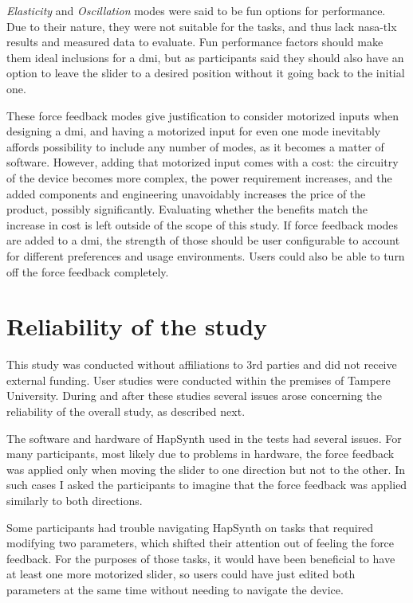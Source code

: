 \textit{Elasticity} and \textit{Oscillation} modes were said to be fun options for performance. Due to their nature, they were not suitable for the tasks, and thus lack \gls{nasa-tlx} results and measured data to evaluate. Fun performance factors should make them ideal inclusions for a \gls{dmi}, but as participants said they should also have an option to leave the slider to a desired position without it going back to the initial one.

These force feedback modes give justification to consider motorized inputs when designing a \gls{dmi}, and having a motorized input for even one mode inevitably affords possibility to include any number of modes, as it becomes a matter of software. However, adding that motorized input comes with a cost: the circuitry of the device becomes more complex, the power requirement increases, and the added components and engineering unavoidably increases the price of the product, possibly significantly. Evaluating whether the benefits match the increase in cost is left outside of the scope of this study. If force feedback modes are added to a \gls{dmi}, the strength of those should be user configurable to account for different preferences and usage environments. Users could also be able to turn off the force feedback completely.

\section{Reliability of the study}

This study was conducted without affiliations to 3rd parties and did not receive external funding. User studies were conducted within the premises of Tampere University. During and after these studies several issues arose concerning the reliability of the overall study, as described next.

The software and hardware of HapSynth used in the tests had several issues. For many participants, most likely due to problems in hardware, the force feedback was applied only when moving the slider to one direction but not to the other. In such cases I asked the participants to imagine that the force feedback was applied similarly to both directions.

Some participants had trouble navigating HapSynth on tasks that required modifying two parameters, which shifted their attention out of feeling the force feedback. For the purposes of those tasks, it would have been beneficial to have at least one more motorized slider, so users could have just edited both parameters at the same time without needing to navigate the device.

